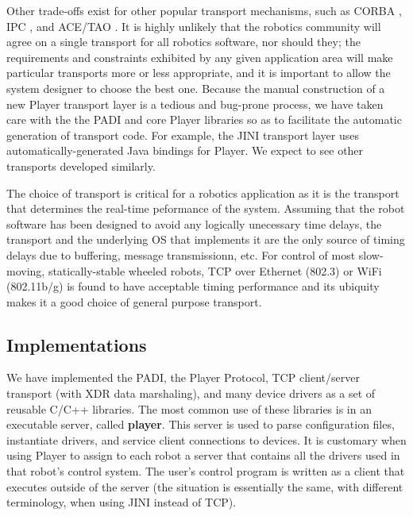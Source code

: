 Other trade-offs exist for other popular transport mechanisms, such as
CORBA \cite{32_CORBA}, IPC \cite{32_IPC}, and ACE/TAO \cite{32_ACETAO}.  It
is highly unlikely that the robotics community will agree on a single
transport for all robotics software, nor should they; the requirements and
constraints exhibited by any given application area will make particular
transports more or less appropriate, and it is important to allow the
system designer to choose the best one.  Because the manual construction of
a new Player transport layer is a tedious and bug-prone process, we have
taken care with the the PADI and core Player libraries so as to facilitate
the automatic generation of transport code.  For example, the JINI
transport layer uses automatically-generated Java bindings for Player.  We
expect to see other transports developed similarly.

The choice of transport is critical for a robotics application as it
is the transport that determines the real-time peformance of the
system. Assuming that the robot software has been designed to avoid
any logically unecessary time delays, the transport and the underlying
OS that implements it are the only source of timing delays due to
buffering, message transmissionn, etc. For control of most
slow-moving, statically-stable wheeled robots, TCP over Ethernet (802.3) or
WiFi (802.11b/g) is found to have acceptable timing performance and its ubiquity
makes it a good choice of general purpose transport.

\subsection{Implementations}

We have implemented the PADI, the Player Protocol, TCP client/server
transport (with XDR data marshaling), and many device drivers as a set
of reusable C/C++ libraries.  The most common use of these libraries
is in an executable server, called {\bf player}.  This server is used
to parse configuration files, instantiate drivers, and service client
connections to devices.  It is customary when using Player to assign
to each robot a server that contains all the drivers used in that
robot's control system.  The user's control program is written as a
client that executes outside of the server (the situation is
essentially the same, with different terminology, when using JINI
instead of TCP).


